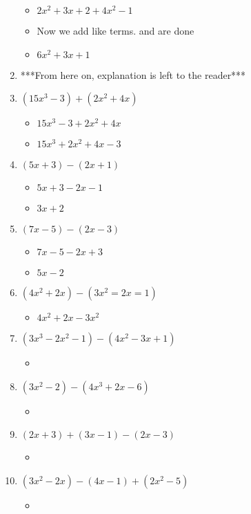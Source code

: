 \begin{enumerate}
\begin{itemize}
  \item $2x^{2}+3x+2+4x^{2}-1$
  \item [] Now we add like terms. and are done
  \item $6x^{2}+3x+1$
  \end{itemize}
\item [] ***From here on, explanation is left to the reader***
\item $(15x^{3}-3)+(2x^{2}+4x)$
  \begin{itemize}
  \item $15x^{3}-3+2x^{2}+4x$
  \item $15x^{3}+2x^{2}+4x-3$
  \end{itemize}
\item $(5x+3)-(2x+1)$
  \begin{itemize}
  \item $5x+3-2x-1$
  \item $3x+2$
  \end{itemize}
\item $(7x-5)-(2x-3)$
  \begin{itemize}
  \item $7x-5-2x+3$
  \item $5x-2$
  \end{itemize}
\item $(4x^{2}+2x)-(3x^{2}=2x=1)$
  \begin{itemize}
  \item $4x^{2}+2x-3x^{2}$
  \end{itemize}
\item $(3x^{3}-2x^{2}-1)-(4x^{2}-3x+1)$
  \begin{itemize}
  \item 
  \end{itemize}
\item $(3x^{2}-2)-(4x^{3}+2x-6)$
  \begin{itemize}
  \item 
  \end{itemize}
\item $(2x+3)+(3x-1)-(2x-3)$
  \begin{itemize}
  \item 
  \end{itemize}
\item $(3x^{2}-2x)-(4x-1)+(2x^{2}-5)$
  \begin{itemize}
  \item 
  \end{itemize}

\end{enumerate}
